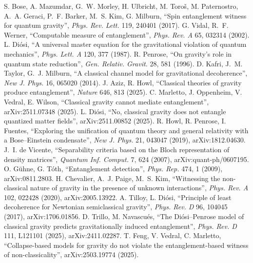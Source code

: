  S. Bose, A. Mazumdar, G.~W. Morley, H. Ulbricht, M. Toro\v{s}, M. Paternostro, A.~A. Geraci, P.~F. Barker, M.~S. Kim, G.
Milburn, ``Spin entanglement witness for quantum gravity'', \emph{Phys. Rev. Lett.} 119, 240401 (2017).
 G. Vidal, R.~F. Werner, ``Computable measure of entanglement'', \emph{Phys. Rev. A} 65, 032314 (2002).
 L. Di\'osi, ``A universal master equation for the gravitational violation of quantum mechanics'', \emph{Phys. Lett. A}
120, 377 (1987).
 R. Penrose, ``On gravity's role in quantum state reduction'', \emph{Gen. Relativ. Gravit.} 28, 581 (1996).
 D. Kafri, J.~M. Taylor, G.~J. Milburn, ``A classical channel model for gravitational decoherence'', \emph{New J. Phys.} 16,
065020 (2014).
 J. Aziz, R. Howl, ``Classical theories of gravity produce entanglement'', \emph{Nature} 646, 813 (2025).
 C. Marletto, J. Oppenheim, V. Vedral, E. Wilson, ``Classical gravity cannot mediate entanglement'', arXiv:2511.07348
(2025).
 L. Di\'osi, ``No, classical gravity does not entangle quantized matter fields'', arXiv:2511.00852 (2025).
 R. Howl, R. Penrose, I. Fuentes, ``Exploring the unification of quantum theory and general relativity with a
Bose--Einstein condensate'', \emph{New J. Phys.} 21, 043047 (2019), arXiv:1812.04630.
 J.~I. de Vicente, ``Separability criteria based on the Bloch representation of density matrices'', \emph{Quantum
Inf. Comput.} 7, 624 (2007), arXiv:quant-ph/0607195.
 O. G\"uhne, G. T\'oth, ``Entanglement detection'', \emph{Phys. Rep.} 474, 1 (2009), arXiv:0811.2803.
 H. Chevalier, A.~J. Paige, M.~S. Kim, ``Witnessing the non-classical nature of gravity in the presence of unknown
interactions'', \emph{Phys. Rev. A} 102, 022428 (2020), arXiv:2005.13922.
 A. Tilloy, L. Di\'osi, ``Principle of least decoherence for Newtonian semiclassical gravity'', \emph{Phys. Rev. D}
96, 104045 (2017), arXiv:1706.01856.
 D. Trillo, M. Navascu\'es, ``The Di\'osi--Penrose model of classical gravity predicts gravitationally induced
entanglement'', \emph{Phys. Rev. D} 111, L121101 (2025), arXiv:2411.02287.
 T. Feng, V. Vedral, C. Marletto, ``Collapse-based models for gravity do not violate the entanglement-based witness of
non-classicality'', arXiv:2503.19774 (2025).
